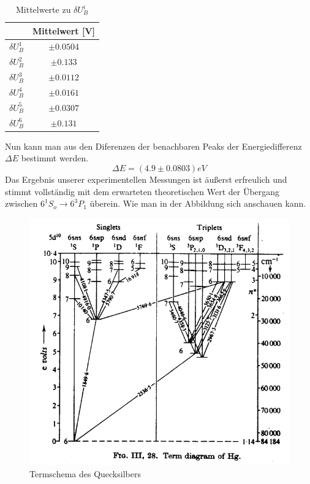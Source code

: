 \documentclass{article}
\begin{document}
\begin{multicols}{2}
\begin{table}[H]
  \centering
  \begin{tabular}{cc} 
      \hline
       & Mittelwert [V] \\ \hline
      $\delta U^1_B$ & $\pm 0.0504$ \\ \hline
      $\delta U^2_B$ & $\pm 0.133$ \\ \hline
      $\delta U^3_B$ & $\pm 0.0112$ \\ \hline
      $\delta U^4_B$ & $\pm 0.0161$ \\ \hline
      $\delta U^5_B$ & $\pm 0.0307$ \\ \hline
      $\delta U^6_B$ & $\pm 0.131$ \\ \hline
  \end{tabular}
  \caption{Mittelwerte zu $\delta U^i_B$}
  \label{tab:mean_values}
\end{table}
Nun kann man aus den Diferenzen der benachbaren Peaks der Energiedifferenz $\Delta E$ bestimmt werden. 
\begin{equation*}
  \Delta E=(4.9 \pm 0.0803)eV
\end{equation*}
Das Ergebnis unserer experimentellen Messungen ist äußerst erfreulich und stimmt vollständig 
mit dem erwarteten theoretischen Wert der Übergang zwischen $6^1 S_o \rightarrow 6^3P_1$ überein. 
Wie man in der Abbildung sich anschauen kann. 
\begin{figure}[H]
  \centering
  \includegraphics[scale=0.45]{Vereinfachtes Hg-Termschema.png}
  \caption{Termschema des Quecksilbers}
\end{figure}
\clearpage

\end{multicols}
\end{document}
